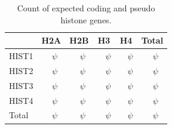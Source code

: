\documentclass[10pt,a4paper,twocolumn,article]{memoir}
\begin{document}
      \begin{table}
        \caption{Count of expected coding and pseudo histone genes.}
        \label{tab:histone-gene-count}
        \centering
        \begin{tabular}{l r@{ + }l<{$\psi$} r@{ + }l<{$\psi$} r@{ + }l<{$\psi$} r@{ + }l<{$\psi$} r@{ + }l<{$\psi$}}
          \toprule
          \null   & \multicolumn{2}{c}{H2A}  & \multicolumn{2}{c}{H2B}
                  & \multicolumn{2}{c}{H3}   & \multicolumn{2}{c}{H4}
                  & \multicolumn{2}{c}{Total} \\
          \midrule
          HIST1   & \HISTOneHTwoACoding{}     & \HISTOneHTwoAPseudo{}
                  & \HISTOneHTwoBCoding{}     & \HISTOneHTwoBPseudo{}
                  & \HISTOneHThreeCoding{}    & \HISTOneHThreePseudo{}
                  & \HISTOneHFourCoding{}     & \HISTOneHFourPseudo{}
                  & \CodingGenesInHISTOne{}   & \PseudoGenesInHISTOne{} \\
          HIST2   & \HISTTwoHTwoACoding{}     & \HISTTwoHTwoAPseudo{}
                  & \HISTTwoHTwoBCoding{}     & \HISTTwoHTwoBPseudo{}
                  & \HISTTwoHThreeCoding{}    & \HISTTwoHThreePseudo{}
                  & \HISTTwoHFourCoding{}     & \HISTTwoHFourPseudo{}
                  & \CodingGenesInHISTTwo{}   & \PseudoGenesInHISTTwo{} \\
          HIST3   & \HISTThreeHTwoACoding{}   & \HISTThreeHTwoAPseudo{}
                  & \HISTThreeHTwoBCoding{}   & \HISTThreeHTwoBPseudo{}
                  & \HISTThreeHThreeCoding{}  & \HISTThreeHThreePseudo{}
                  & \HISTThreeHFourCoding{}   & \HISTThreeHFourPseudo{}
                  & \CodingGenesInHISTThree{} & \PseudoGenesInHISTThree{} \\
          HIST4   & \HISTFourHTwoACoding{}    & \HISTFourHTwoAPseudo{}
                  & \HISTFourHTwoBCoding{}    & \HISTFourHTwoBPseudo{}
                  & \HISTFourHThreeCoding{}   & \HISTFourHThreePseudo{}
                  & \HISTFourHFourCoding{}    & \HISTFourHFourPseudo{}
                  & \CodingGenesInHISTFour{}  & \PseudoGenesInHISTFour{} \\
          \addlinespace
          Total   & \TotalCodingHTwoA{}       & \TotalPseudoHTwoA{}
                  & \TotalCodingHTwoB{}       & \TotalPseudoHTwoB{}
                  & \TotalCodingHThree{}      & \TotalPseudoHThree{}
                  & \TotalCodingHFour{}       & \TotalPseudoHFour{} \\
          \bottomrule
        \end{tabular}
      \end{table}
\end{document}
